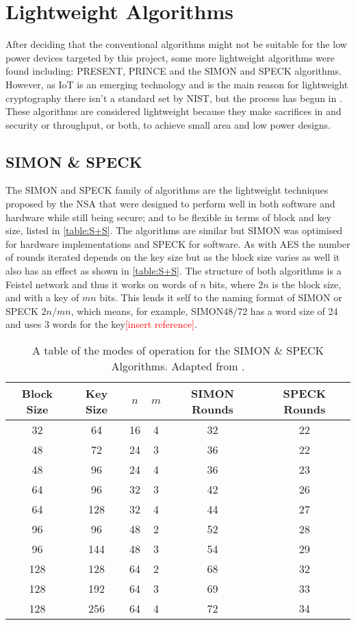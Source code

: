 \documentclass[12pt,twoside,a4paper]{report}
\begin{document}
	\section{Lightweight Algorithms}
	\label{section:light}
	After deciding that the conventional algorithms might not be suitable for the low power devices targeted by this project, some more lightweight algorithms were found including: PRESENT\cite{Bogdanov2007}, PRINCE\cite{Borghoff2012} and the SIMON and SPECK algorithms\cite{Beaulieu2013}. However, as IoT is an emerging technology and is the main reason for lightweight cryptography there isn't a standard set by NIST, but the process has begun in \cite{Mckay}. These algorithms are considered lightweight because they make sacrifices in and security or throughput, or both, to achieve small area and low power designs.
    
	\subsection{SIMON \& SPECK}
	The SIMON and SPECK family of algorithms are the lightweight techniques proposed by the NSA that were designed to perform well in both software and hardware while still being secure; and to be flexible in terms of block and key size, listed in \autoref{table:S+S}. The algorithms are similar but SIMON was optimised for hardware implementations and SPECK for software. As with AES the number of rounds iterated depends on the key size but as the block size varies as well it also has an effect as shown in \autoref{table:S+S}. The structure of both algorithms is a Feistel network and thus it works on words of $n$ bits, where $2n$ is the block size, and with a key of $mn$ bits. This lends it self to the naming format of SIMON or SPECK $2n/mn$, which means, for example, SIMON48/72 has a word size of 24 and uses 3 words for the key\textcolor{red}{[insert reference]}.
    
	\begin{table}[H]
	\centering
	\begin{tabular}{||c|c|c|c|c|c||}
		\hline \hline
		Block Size & Key Size & $n$ & $m$ & SIMON Rounds & SPECK Rounds \\
		\hline \hline
		32 & 64 & 16 & 4 & 32 & 22 \\
		\hline
		48 & 72 & 24 & 3 & 36 & 22 \\
		48 & 96 & 24 & 4 & 36 & 23 \\
		\hline
		64 & 96 & 32 & 3 & 42 & 26 \\
		64 & 128 & 32 & 4 & 44 & 27 \\
		\hline
		96 & 96 & 48 & 2 & 52 & 28 \\
		96 & 144 & 48 & 3 & 54 & 29 \\
		\hline
		128 & 128 & 64 & 2 & 68 & 32 \\
		128 & 192 & 64 & 3 & 69 & 33 \\
 		128 & 256 & 64 & 4 & 72 & 34 \\
		\hline \hline
	\end{tabular}
	\caption{A table of the modes of operation for the SIMON \& SPECK Algorithms. Adapted from \cite{Beaulieu2015}.}
	\label{table:S+S}
	\end{table}    
    
\end{document}
